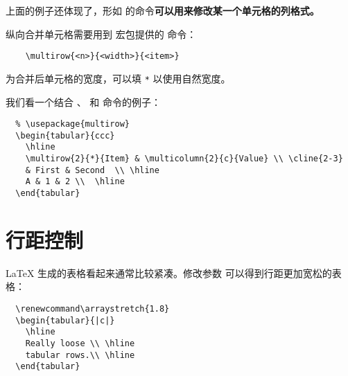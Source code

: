 上面的例子还体现了，形如  的命令{\bf 可以用来修改某一个单元格的列格式。}

纵向合并单元格需要用到  宏包提供的  命令：
\begin{lstlisting}
	\multirow{<n>}{<width>}{<item>}
\end{lstlisting}
 为合并后单元格的宽度，可以填 \texttt{*} 以使用自然宽度。

我们看一个结合 、 和  命令的例子：

\begin{lstlisting}
  % \usepackage{multirow}
  \begin{tabular}{ccc}
    \hline
    \multirow{2}{*}{Item} & \multicolumn{2}{c}{Value} \\ \cline{2-3}
    & First & Second  \\ \hline
    A & 1 & 2 \\  \hline
  \end{tabular}
\end{lstlisting}
\begin{center}
\end{center}


\section{行距控制}
\LaTeX{} 生成的表格看起来通常比较紧凑。修改参数  可以得到行距更加宽松的表格：
\begin{lstlisting}
  \renewcommand\arraystretch{1.8}
  \begin{tabular}{|c|}
    \hline
    Really loose \\ \hline
    tabular rows.\\ \hline
  \end{tabular}
\end{lstlisting}
\begin{center}
\end{center}

